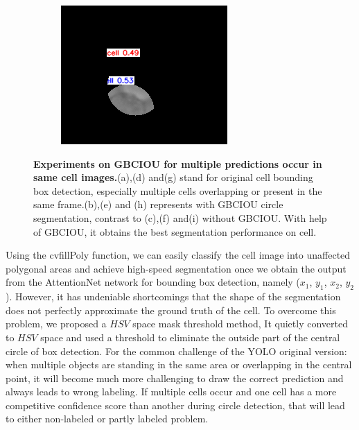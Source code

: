 \begin{figure}[h]
\begin{center}
\begin{subfigure}[b]{0.25\textwidth}
		\end{subfigure}
		\begin{subfigure}[b]{0.25\textwidth}
		    \centering
			\includegraphics[width=\textwidth]{thesis-template-master/images/gbciou12.png}
			\caption{}
			\label{fig:cellnet}
		\end{subfigure}
	\end{center}
	\caption{\textbf{Experiments on GBCIOU for multiple predictions occur in same cell images.}(a),(d) and(g) stand for original cell bounding box detection, especially multiple cells overlapping or present in the same frame.(b),(e) and (h) represents with  GBCIOU circle segmentation, contrast to (c),(f) and(i) without GBCIOU. With help of GBCIOU, it obtains the best segmentation performance on cell.}
\end{figure}

Using the cvfillPoly function, we can easily classify the cell image into unaffected polygonal areas and achieve high-speed segmentation once we obtain the output from the AttentionNet network for bounding box detection, namely ($x_{1}$, $y_{1}$, $x_{2}$, $y_{2}$). However, it has undeniable shortcomings that the shape of the segmentation does not perfectly approximate the ground truth of the cell. To overcome this problem, we proposed a $ HSV $ space mask threshold method, It quietly converted to $ HSV $ space and used a threshold to eliminate the outside part of the central circle of box detection.  For the common challenge of the YOLO original version\cite{yolov1}: when multiple objects are standing in the same area or overlapping in the central point, it will become much more challenging to draw the correct prediction and always leads to wrong labeling. If multiple cells occur and one cell has a more competitive confidence score than another during circle detection, that will lead to either non-labeled or partly labeled problem.

